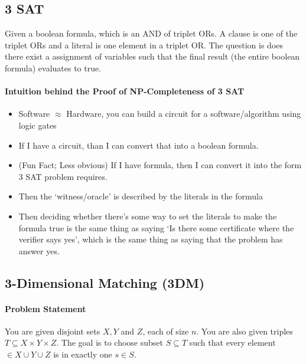 \documentclass[10pt]{article}
\begin{document}
\subsection{3 SAT} Given a boolean formula, which is an AND of triplet ORs. A clause is one of the triplet ORs and a literal is one element in a triplet OR. The question is does there exist a assignment of variables such that the final result (the entire boolean formula) evaluates to true. 
\paragraph{Intuition behind the Proof of NP-Completeness of 3 SAT}
\begin{itemize}
    \item Software $\approx$ Hardware, you can build a circuit for a software/algorithm using logic gates
    \item If I have a circuit, than I can convert that into a boolean formula.
    \item (Fun Fact; Less obvious) If I have formula, then I can convert it into the form 3 SAT problem requires. 
    \item Then the `witness/oracle' is described by the literals in the formula
    \item Then deciding whether there's some way to set the literals to make the formula true is the same thing as saying `Is there some certificate where the verifier says yes', which is the same thing as saying that the problem has answer yes.
\end{itemize}

\subsection{3-Dimensional Matching (3DM)}
\paragraph{Problem Statement} You are given disjoint sets $X, Y$ and $Z$, each of size $n$. You are also given triples $T\subseteq X\times Y \times Z$. The goal is to choose subset $S\subseteq T$ such that every element $\in X \cup Y \cup Z$ is in exactly one $s\in S$. 
\end{document}

